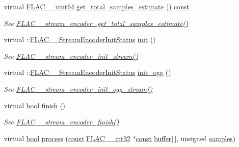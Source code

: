 \begin{DoxyCompactItemize}
virtual \hyperlink{ordinals_8h_aa78c8c70a3eb8a58af7436f278acde8e}{F\+L\+A\+C\+\_\+\+\_\+uint64} \hyperlink{class_f_l_a_c_1_1_encoder_1_1_stream_a2dd6b82169ab97be14a9c83a1c5a974d}{get\+\_\+total\+\_\+samples\+\_\+estimate} () \hyperlink{getopt1_8c_a2c212835823e3c54a8ab6d95c652660e}{const} 
\begin{DoxyCompactList}\small\item\em See \hyperlink{group__flac__stream__encoder_ga8b206187a5b2a261ad4b5067fa43525b}{F\+L\+A\+C\+\_\+\+\_\+stream\+\_\+encoder\+\_\+get\+\_\+total\+\_\+samples\+\_\+estimate()} \end{DoxyCompactList}\item 
virtual \+::\hyperlink{group__flac__stream__encoder_ga3bb869620af2b188d77982a5c30b047d}{F\+L\+A\+C\+\_\+\+\_\+\+Stream\+Encoder\+Init\+Status} \hyperlink{class_f_l_a_c_1_1_encoder_1_1_stream_ad39dffdff05aa5e75bffb0bf897bf097}{init} ()
\begin{DoxyCompactList}\small\item\em See \hyperlink{group__flac__stream__encoder_ga85221c4ceb9f22dfd4983d8f07a9a35b}{F\+L\+A\+C\+\_\+\+\_\+stream\+\_\+encoder\+\_\+init\+\_\+stream()} \end{DoxyCompactList}\item 
virtual \+::\hyperlink{group__flac__stream__encoder_ga3bb869620af2b188d77982a5c30b047d}{F\+L\+A\+C\+\_\+\+\_\+\+Stream\+Encoder\+Init\+Status} \hyperlink{class_f_l_a_c_1_1_encoder_1_1_stream_a78c593ff0e5b59804a9e629799e18036}{init\+\_\+ogg} ()
\begin{DoxyCompactList}\small\item\em See \hyperlink{group__flac__stream__encoder_ga87af71d74c09f7d482f9f420ef9bf826}{F\+L\+A\+C\+\_\+\+\_\+stream\+\_\+encoder\+\_\+init\+\_\+ogg\+\_\+stream()} \end{DoxyCompactList}\item 
virtual \hyperlink{mac_2config_2i386_2lib-src_2libsoxr_2soxr-config_8h_abb452686968e48b67397da5f97445f5b}{bool} \hyperlink{class_f_l_a_c_1_1_encoder_1_1_stream_a90e5e82bf38eb2300f2420bae2114b21}{finish} ()
\begin{DoxyCompactList}\small\item\em See \hyperlink{group__flac__stream__encoder_gab2c1e5477c1e3fe9ad0d722ff8eecda2}{F\+L\+A\+C\+\_\+\+\_\+stream\+\_\+encoder\+\_\+finish()} \end{DoxyCompactList}\item 
virtual \hyperlink{mac_2config_2i386_2lib-src_2libsoxr_2soxr-config_8h_abb452686968e48b67397da5f97445f5b}{bool} \hyperlink{class_f_l_a_c_1_1_encoder_1_1_stream_a9d534617f2996c3666f05226ffbad35f}{process} (\hyperlink{getopt1_8c_a2c212835823e3c54a8ab6d95c652660e}{const} \hyperlink{ordinals_8h_a33fd77bfe6d685541a0c034a75deccdc}{F\+L\+A\+C\+\_\+\+\_\+int32} $\ast$\hyperlink{getopt1_8c_a2c212835823e3c54a8ab6d95c652660e}{const} \hyperlink{structbuffer}{buffer}\mbox{[}$\,$\mbox{]}, unsigned \hyperlink{test__w__saw8_8c_a54185623a5a093f671a73e5fba6197a1}{samples})

\end{DoxyCompactItemize}
